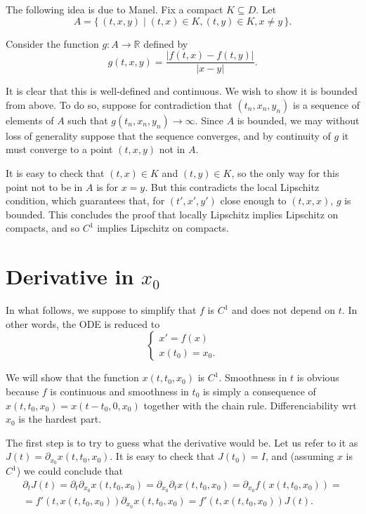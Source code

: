 \documentclass{article}
\newcommand{\R}{\mathbb{R}}
\begin{document}
The following idea is due to Manel. Fix a compact $K \subseteq D$. Let
\[A = \{\,(t,x,y) \mid (t,x) \in K, (t,y) \in K, x \neq y\,\}.\]

Consider the function $g : A \to \R$ defined by
\[g(t,x,y) = \frac{\lvert f(t,x) - f(t,y) \rvert}{\lvert x-y \rvert}.\]

It is clear that this is well-defined and continuous. We wish to show it is bounded from above. To do so, suppose for contradiction that $(t_n, x_n, y_n)$ is a sequence of elements of $A$ such that $g(t_n, x_n, y_n) \to \infty$. Since $A$ is bounded, we may without loss of generality suppose that the sequence converges, and by continuity of $g$ it must converge to a point $(t,x,y)$ not in $A$.

It is easy to check that $(t,x) \in K$ and $(t,y) \in K$, so the only way for this point not to be in $A$ is for $x = y$. But this contradicts the local Lipschitz condition, which guarantees that, for $(t',x',y')$ close enough to $(t,x,x)$, $g$ is bounded. This concludes the proof that locally Lipschitz implies Lipschitz on compacts, and so $C^1$ implies Lipschitz on compacts.

\section{Derivative in $x_0$}

In what follows, we suppose to simplify that $f$ is $C^1$ and does not depend on $t$. In other words, the ODE is reduced to
\[
\begin{cases}
x' = f(x)\\
x(t_0) = x_0.
\end{cases}
\]

We will show that the function $x(t,t_0,x_0)$ is $C^1$. Smoothness in $t$ is obvious because $f$ is continuous and smoothness in $t_0$ is simply a consequence of $x(t,t_0,x_0) = x(t-t_0, 0, x_0)$ together with the chain rule. Differenciability wrt $x_0$ is the hardest part.

The first step is to try to guess what the derivative would be. Let us refer to it as $J(t) = \partial_{x_0} x(t,t_0,x_0)$. It is easy to check that $J(t_0) = I$, and (assuming $x$ is $C^1$) we could conclude that
\begin{multline*}
\partial_t J(t) = \partial_t \partial_{x_0} x(t,t_0,x_0) = \partial_{x_0} \partial_t x(t,t_0,x_0) = \partial_{x_0} f(x(t,t_0,x_0)) =\\
= f'(t, x(t,t_0,x_0)) \partial_{x_0} x(t,t_0,x_0) = f'(t, x(t,t_0,x_0)) J(t).
\end{multline*}
\end{document}
